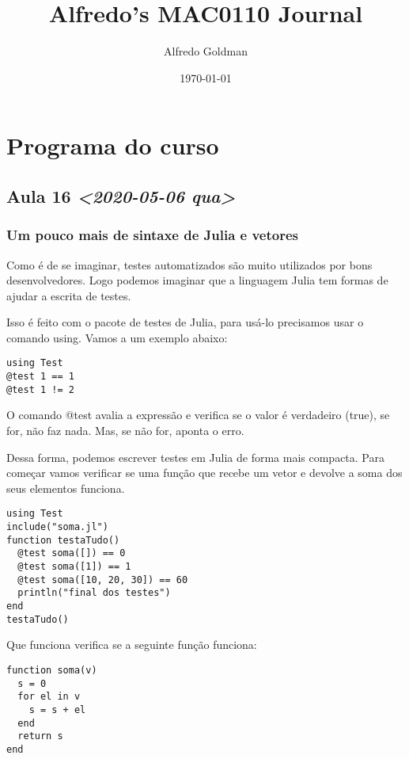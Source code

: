\documentclass[a4paper]{article}
\author{Alfredo Goldman}
\date{\today}
\title{Alfredo's MAC0110 Journal}
\begin{document}
\maketitle

\section{Programa do curso}

\subsection{Aula 16 \textit{<2020-05-06 qua>}}
\label{sec:org881c781}
\subsubsection{Um pouco mais de sintaxe de Julia e vetores}
\label{sec:org06f3ee9}

Como é de se imaginar, testes automatizados são muito
utilizados por bons desenvolvedores. Logo podemos imaginar
que a linguagem Julia tem formas de ajudar a escrita de
testes.

Isso é feito com o pacote de testes de Julia, para usá-lo precisamos
usar o comando using. Vamos a um exemplo abaixo:
\lstset{language=ein-julia,label= ,caption= ,captionpos=b,numbers=none}
\begin{lstlisting}
using Test
@test 1 == 1
@test 1 != 2
\end{lstlisting}

 O comando @test avalia a expressão e verifica se o valor é
verdadeiro (true), se for, não faz nada. Mas, se não for, aponta
o erro.

 Dessa forma, podemos escrever testes em Julia de forma mais compacta.
Para começar vamos verificar se uma função que recebe um vetor e devolve
a soma dos seus elementos funciona.

\lstset{language=ein-julia,label= ,caption= ,captionpos=b,numbers=none}
\begin{lstlisting}
using Test
include("soma.jl")
function testaTudo()
  @test soma([]) == 0
  @test soma([1]) == 1
  @test soma([10, 20, 30]) == 60
  println("final dos testes")
end
testaTudo()
\end{lstlisting}
Que funciona verifica se a seguinte função funciona:

\lstset{language=ein-julia,label= ,caption= ,captionpos=b,numbers=none}
\begin{lstlisting}
function soma(v)
  s = 0
  for el in v
    s = s + el
  end
  return s
end
\end{lstlisting}
\end{document}
